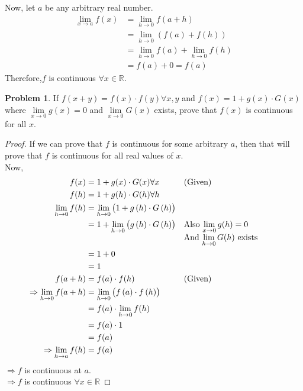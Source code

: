 \documentclass[14]{article}
\theoremstyle{definition}
\newtheorem{prob}{Problem}
\begin{document}
Now, let $a$ be any arbitrary real number.
\begin{align*}
\lim\limits_{x \to a} f(x) &= \lim\limits_{h \to 0} f(a + h)\\
&= \lim\limits_{h \to 0} \left( f(a) + f(h) \right)\\
&= \lim\limits_{h \to 0} f(a) + \lim\limits_{h \to 0} f(h)\\
&= f(a) + 0 = f(a)
\end{align*}
Therefore,$f$ is continuous $\forall x \in \mathbb{R}$.
\pagebreak
\begin{prob}
If $f(x + y) = f(x) \cdot f(y) \forall x, y$ and $f(x) = 1 + g(x) \cdot G(x)$ where $\lim\limits_{x \to 0} g(x) = 0$ and $\lim\limits_{x \to 0} G(x)$ exists, prove that $f(x)$ is continuous for all $x$.
\begin{proof}
If we can prove that $f$ is continuous for some arbitrary $a$, then that will prove that $f$ is continuous for all real values of $x$.\\
Now,
\begin{align*}
f(x) &= 1 + g(x) \cdot G(x) \forall x && \text{(Given)}\\
f(h) &= 1 + g(h) \cdot G(h) \forall h\\
\lim\limits_{h \to 0} f(h) &= \lim\limits_{h \to 0} \left( 1 + g\left( h \right) \cdot G\left( h \right) \right)\\
&=  1 + \lim\limits_{h \to 0} \left(g\left( h \right) \cdot G\left( h \right) \right) &&\parbox[t]{4cm}{Also $\lim\limits_{x \to 0} g(h) = 0$\\And $\lim\limits_{h \to 0} G(h)$ exists}\\
&= 1 + 0\\
&= 1\\
f(a+h) &= f(a) \cdot f(h) && \text{(Given)}\\
\Rightarrow \lim\limits_{h \to 0} f(a+h) &= \lim\limits_{h \to 0} \left( f\left( a \right) \cdot f \left( h \right) \right)\\
&= f(a) \cdot \lim\limits_{h \to 0} f(h)\\
&= f(a) \cdot 1\\
&= f(a)\\
\Rightarrow \lim\limits_{h \to a} f(h) &= f(a)
\end{align*}
$\Rightarrow f$ is continuous at $a$.\\
$\Rightarrow f$ is continuous $\forall x \in \mathbb{R}$
\end{proof}
\end{prob}
\end{document}
